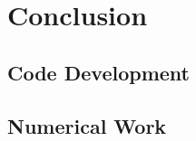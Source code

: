


\chapter{Conclusion}
  \label{ch_conclusion}

\todo{$\cdots$}

\section{Code Development}







\section{Numerical Work}





